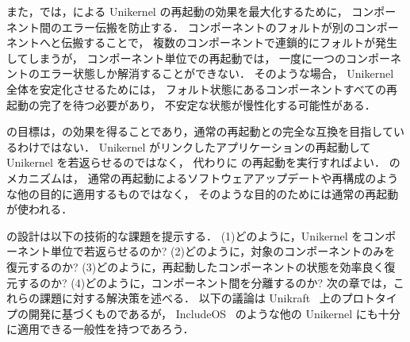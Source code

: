 また，\sysname では，\rr による Unikernel の再起動の効果を最大化するために，
コンポーネント間のエラー伝搬を防止する．
コンポーネントのフォルトが別のコンポーネントへと伝搬することで，
複数のコンポーネントで連鎖的にフォルトが発生してしまうが，
コンポーネント単位での再起動では，
一度に一つのコンポーネントのエラー状態しか解消することができない．
そのような場合，
Unikernel 全体を安定化させるためには，
フォルト状態にあるコンポーネントすべての再起動の完了を待つ必要があり，
不安定な状態が慢性化する可能性がある．

\sysname の目標は，\rr の効果を得ることであり，通常の再起動との完全な互換を目指しているわけではない．
Unikernel がリンクしたアプリケーションの再起動して Unikernel を若返らせるのではなく，
代わりに \sysname の再起動を実行すればよい．
\sysname のメカニズムは，
通常の再起動によるソフトウェアアップデートや再構成のような他の目的に適用するものではなく，
そのような目的のためには通常の再起動が使われる．

\sysname の設計は以下の技術的な課題を提示する．
(1)どのように，Unikernel をコンポーネント単位で若返らせるのか?
(2)どのように，対象のコンポーネントのみを復元するのか?
(3)どのように，再起動したコンポーネントの状態を効率良く復元するのか?
(4)どのように，コンポーネント間を分離するのか?
次の章では，これらの課題に対する解決策を述べる．
以下の議論は Unikraft~\cite{KuenzerEtAl-Unikraft} 上のプロトタイプの開発に基づくものであるが，
IncludeOS~\cite{BratterudEtAl-IncludeOS} のような他の Unikernel にも十分に適用できる一般性を持つであろう．

